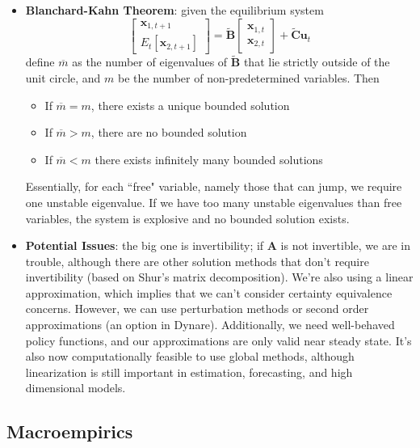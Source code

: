 \documentclass[12pt]{article}
\begin{document}
\begin{itemize}
    \item \textbf{Blanchard-Kahn Theorem}: given the equilibrium system 
    \[\begin{bmatrix}
        \textbf{x}_{1,t+1} \\
        E_t[\textbf{x}_{2,t+1}]
        \end{bmatrix} = \boldsymbol{\widetilde{B}}\begin{bmatrix}
        \textbf{x}_{1,t}\\
        \textbf{x}_{2,t}
        \end{bmatrix} + \boldsymbol{\widetilde{C}}\textbf{u}_t
    \]
    define $\overline{m}$ as the number of eigenvalues of $\boldsymbol{\widetilde{B}}$ that lie strictly outside of the unit circle, and $m$ be the number of non-predetermined variables. Then
    \begin{itemize}
        \item If $\overline{m} = m$, there exists a unique bounded solution
        \item If $\overline{m} > m$, there are no bounded solution
        \item If $\overline{m} < m$ there exists infinitely many bounded solutions
    \end{itemize}
    Essentially, for each ``free" variable, namely those that can jump, we require one unstable eigenvalue. If we have too many unstable eigenvalues than free variables, the system is explosive and no bounded solution exists.
    \item \textbf{Potential Issues}: the big one is invertibility; if $\textbf{A}$ is not invertible, we are in trouble, although there are other solution methods that don't require invertibility (based on Shur's matrix decomposition). We're also using a linear approximation, which implies that we can't consider certainty equivalence concerns. However, we can use perturbation methods or second order approximations (an option in Dynare). Additionally, we need well-behaved policy functions, and our approximations are only valid near steady state. It's also now computationally feasible to use global methods, although linearization is still important in estimation, forecasting, and high dimensional models.
\end{itemize}

\subsection{Macroempirics}
\end{document}

